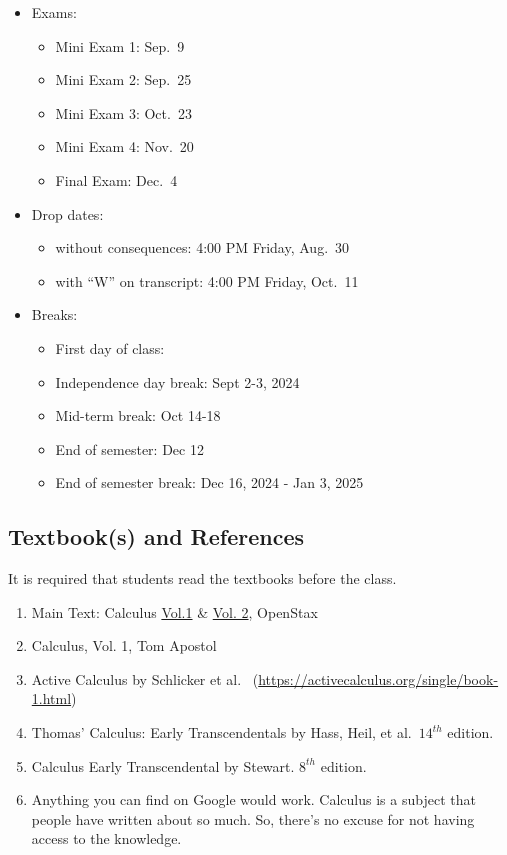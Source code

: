 \documentclass[
]{article}
\providecommand{\tightlist}{%
  \setlength{\itemsep}{0pt}\setlength{\parskip}{0pt}}
\begin{document}
\begin{itemize}
\tightlist
\item
  Exams:

  \begin{itemize}
  \tightlist
  \item
    Mini Exam 1: Sep.~9
  \item
    Mini Exam 2: Sep.~25
  \item
    Mini Exam 3: Oct.~23
  \item
    Mini Exam 4: Nov.~20
  \item
    Final Exam: Dec.~4
  \end{itemize}
\item
  Drop dates:

  \begin{itemize}
  \tightlist
  \item
    without consequences: 4:00 PM Friday, Aug.~30
  \item
    with ``W'' on transcript: 4:00 PM Friday, Oct.~11
  \end{itemize}
\item
  Breaks:

  \begin{itemize}
  \tightlist
  \item
    First day of class:
  \item
    Independence day break: Sept 2-3, 2024
  \item
    Mid-term break: Oct 14-18
  \item
    End of semester: Dec 12
  \item
    End of semester break: Dec 16, 2024 - Jan 3, 2025
  \end{itemize}
\end{itemize}

\subsection*{Textbook(s) and References}\label{textbooks-and-references}

It is required that students read the textbooks before the class.

\begin{enumerate}
\def\labelenumi{\arabic{enumi}.}
\item
  Main Text: Calculus \href{https://openstax.org/details/books/calculus-volume-1}{Vol.1} \& \href{https://openstax.org/details/books/calculus-volume-2}{Vol. 2}, OpenStax
\item
  Calculus, Vol. 1, Tom Apostol
\item
  Active Calculus by Schlicker et al.~
  (\url{https://activecalculus.org/single/book-1.html})
\item
  Thomas' Calculus: Early Transcendentals by Hass, Heil, et al.~\(14^{th}\) edition.
\item
  Calculus Early Transcendental by Stewart. \(8^{th}\) edition.
\item
  Anything you can find on Google would work.
  Calculus is a subject that people have written about
  so much. So, there's no excuse for not having access
  to the knowledge.
\end{enumerate}
\end{document}
